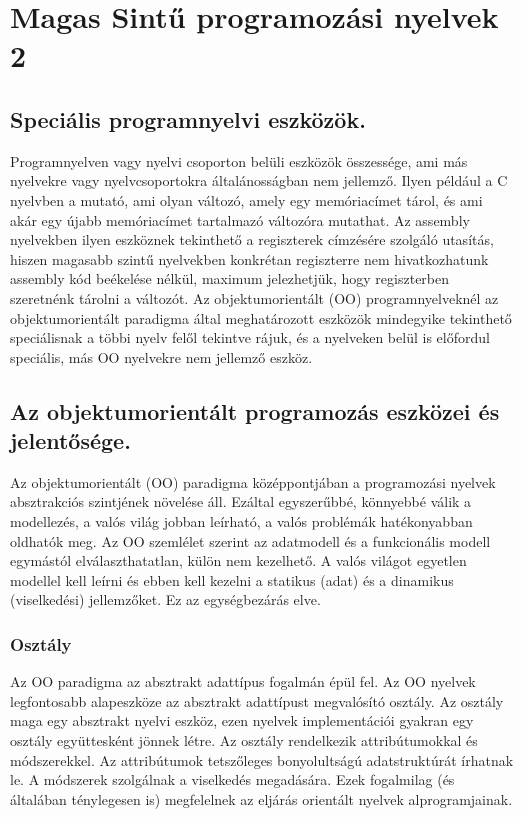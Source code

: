 \section{Magas Sintű programozási nyelvek 2}
\subsection{Speciális programnyelvi eszközök.}
Programnyelven vagy nyelvi csoporton belüli eszközök összessége, ami más nyelvekre vagy nyelvcsoportokra általánosságban nem jellemző. Ilyen például a C nyelvben a mutató, ami olyan változó, amely egy memóriacímet tárol, és ami akár egy újabb memóriacímet tartalmazó változóra mutathat. Az assembly nyelvekben ilyen eszköznek tekinthető a regiszterek címzésére szolgáló utasítás, hiszen magasabb szintű nyelvekben konkrétan regiszterre nem hivatkozhatunk assembly kód beékelése nélkül, maximum jelezhetjük, hogy regiszterben szeretnénk tárolni a változót. Az objektumorientált (OO) programnyelveknél az objektumorientált paradigma által meghatározott eszközök mindegyike tekinthető speciálisnak a többi nyelv felől tekintve rájuk, és a nyelveken belül is előfordul speciális, más OO nyelvekre nem jellemző eszköz.

\subsection{Az objektumorientált programozás eszközei és jelentősége.}
Az objektumorientált (OO) paradigma középpontjában a programozási nyelvek absztrakciós szintjének növelése áll. Ezáltal egyszerűbbé, könnyebbé válik a modellezés, a valós világ jobban leírható, a valós problémák hatékonyabban oldhatók meg. Az OO szemlélet szerint az adatmodell és a funkcionális modell egymástól elválaszthatatlan, külön nem kezelhető. A valós világot egyetlen modellel kell leírni és ebben kell kezelni a statikus (adat) és a dinamikus (viselkedési) jellemzőket. Ez az egységbezárás elve.

\subsubsection{Osztály}
Az OO paradigma az absztrakt adattípus fogalmán épül fel. Az OO nyelvek legfontosabb alapeszköze az absztrakt adattípust megvalósító osztály. Az osztály maga egy absztrakt nyelvi eszköz, ezen nyelvek implementációi gyakran egy osztály együttesként jönnek létre. Az osztály rendelkezik attribútumokkal és módszerekkel. Az attribútumok tetszőleges bonyolultságú adatstruktúrát írhatnak le. A módszerek szolgálnak a viselkedés megadására. Ezek fogalmilag (és általában ténylegesen is) megfelelnek az eljárás orientált nyelvek alprogramjainak.

